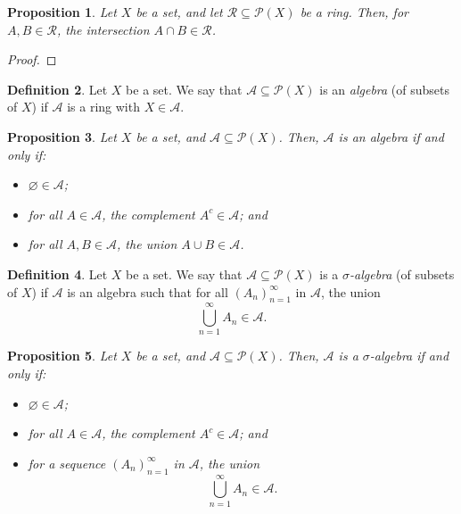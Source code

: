 \documentclass[a4paper, openany]{memoir}
\theoremstyle{definition}
\newtheorem{definition}{Definition}[section]
\theoremstyle{plain}
\newtheorem{proposition}[definition]{Proposition}
\begin{document}
    \begin{proposition}
        Let $X$ be a set, and let $\mathcal{R} \subseteq \mathcal{P}(X)$ be a ring. Then, for $A, B \in \mathcal{R}$, the intersection $A \cap B \in \mathcal{R}$.
    \end{proposition}
    \begin{proof}
        
    \end{proof}

    \begin{definition}
        Let $X$ be a set. We say that $\mathcal{A} \subseteq \mathcal{P}(X)$ is an \emph{algebra} (of subsets of $X$) if $\mathcal{A}$ is a ring with $X \in \mathcal{A}$.
    \end{definition}

    \begin{proposition}
        Let $X$ be a set, and $\mathcal{A} \subseteq \mathcal{P}(X)$. Then, $\mathcal{A}$ is an algebra if and only if:
        \begin{itemize}
            \item $\varnothing \in \mathcal{A}$;
            \item for all $A \in \mathcal{A}$, the complement $A^c \in \mathcal{A}$; and
            \item for all $A, B \in \mathcal{A}$, the union $A \cup B \in \mathcal{A}$.
        \end{itemize}
    \end{proposition}

    \begin{definition}
        Let $X$ be a set. We say that $\mathcal{A} \subseteq \mathcal{P}(X)$ is a \emph{$\sigma$-algebra} (of subsets of $X$) if $\mathcal{A}$ is an algebra such that for all $(A_n)_{n=1}^\infty$ in $\mathcal{A}$, the union
        \[\bigcup_{n=1}^\infty A_n \in \mathcal{A}.\]
    \end{definition}

    \begin{proposition}
        Let $X$ be a set, and $\mathcal{A} \subseteq \mathcal{P}(X)$. Then, $\mathcal{A}$ is a $\sigma$-algebra if and only if:
        \begin{itemize}
            \item $\varnothing \in \mathcal{A}$;
            \item for all $A \in \mathcal{A}$, the complement $A^c \in \mathcal{A}$; and
            \item for a sequence $(A_n)_{n=1}^\infty$ in $\mathcal{A}$, the union
            \[\bigcup_{n=1}^\infty A_n \in \mathcal{A}.\]
        \end{itemize}
    \end{proposition}
\end{document}
